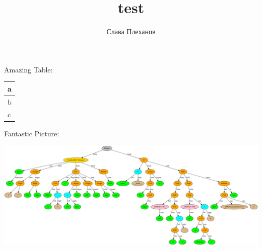 \documentclass{article}
\title{test}
\author{Слава Плеханов}
\begin{document}
    \begin{center}
        Amazing Table:
    \end{center}
\begin{tabular}{ | l | }
\hline
a \\ \hline
b\\
c\\
\hline\end{tabular}
    \hfill \break
    \hfill \break
    \hfill \break
    \hfill \break
    \hfill \break

    \begin{center}
        Fantastic Picture:
    \end{center}
\includegraphics[scale=0.15]{tree.png}
\end{document}
